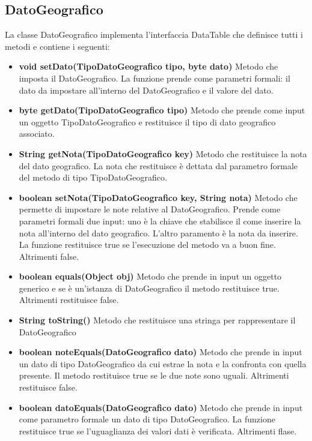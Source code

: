 \documentclass[a4paper, 12pt]{report}
\begin{document}
			\subsection{DatoGeografico}
			La classe DatoGeografico implementa l'interfaccia DataTable che definisce tutti i metodi e contiene i seguenti:
			\begin{itemize}
			\item \textbf{void setDato(TipoDatoGeografico tipo, byte dato)}
			Metodo che imposta il DatoGeografico. La funzione prende come parametri formali: il dato da impostare all'interno del DatoGeografico e il valore del dato. 
			\item \textbf{byte getDato(TipoDatoGeografico tipo)}
			Metodo che prende come input un oggetto TipoDatoGeografico e restituisce il tipo di dato geografico associato.
			\item \textbf{String getNota(TipoDatoGeografico key)}
			Metodo che restituisce la nota del dato geografico. La nota che restituisce è dettata dal parametro formale del metodo di tipo TipoDatoGeografico.
			\item \textbf{boolean setNota(TipoDatoGeografico key, String nota)}
			Metodo che permette di impostare le note relative al DatoGeografico. Prende come parametri formali due input: uno è la chiave che stabilisce il come inserire la nota all'interno del dato geografico. L'altro paramento è la nota da inserire.
			La funzione restituisce true se l'esecuzione del metodo va a buon fine. Altrimenti false.
			\item \textbf{boolean equals(Object obj)}
			Metodo che prende in input un oggetto generico e se è un'istanza di DatoGeografico il metodo restituisce true. Altrimenti restituisce false.
			\item \textbf{String toString()}
			Metodo che restituisce una stringa per rappresentare il DatoGeografico
			\item \textbf{boolean noteEquals(DatoGeografico dato)}
			Metodo che prende in input un dato di tipo DatoGeografico da cui estrae la nota e la confronta con quella presente. Il metodo restituisce true se le due note sono uguali. Altrimenti restituisce false.
			\item \textbf{boolean datoEquals(DatoGeografico dato)}
			Metodo che prende in input come parametro formale un dato di tipo DatoGeografico. La funzione restituisce true se l'uguaglianza dei valori dati è verificata. Altrimenti flase. 
			\end{itemize}
			
%
\end{document}
